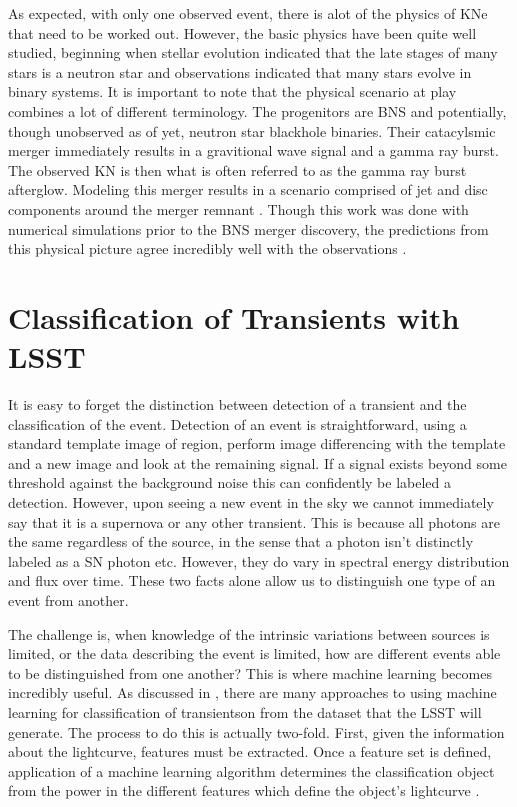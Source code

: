\documentclass[12pt]{article}
\begin{document}
As expected, with only one observed event, there is alot of the physics of KNe that need to be worked out. However, the basic physics have been quite well studied, beginning when stellar evolution indicated that the late stages of many stars is a neutron star and observations indicated that many stars evolve in binary systems. It is important to note that the physical scenario at play combines a lot of different terminology. The progenitors are BNS and potentially, though unobserved as of yet, neutron star blackhole binaries. Their catacylsmic merger immediately results in a gravitional wave signal and a gamma ray burst. The observed KN is then what is often referred to as the gamma ray burst afterglow. Modeling this merger results in a scenario comprised of jet and disc components around the merger remnant \citep{Rosswog2016a}. Though this work was done with numerical simulations prior to the BNS merger discovery, the predictions from this physical picture agree incredibly well with the observations \citep{Kasliwal2017}.\par

\section{Classification of Transients with LSST} %
It is easy to forget the distinction between detection of a transient and the classification of the event. Detection of an event is straightforward, using a standard template image of region, perform image differencing with the template and a new image and look at the remaining signal. If a signal exists beyond some threshold against the background noise this can confidently be labeled a detection. However, upon seeing a new event in the sky we cannot immediately say that it is a supernova or any other transient. This is because all photons are the same regardless of the source, in the sense that a photon isn't distinctly labeled as a SN photon etc. However, they do vary in spectral energy distribution and flux over time. These two facts alone allow us to distinguish one type of an event from another. \par
The challenge is, when knowledge of the intrinsic variations between sources is limited, or the data describing the event is limited, how are different events able to be distinguished from one another? This is where machine learning becomes incredibly useful. As discussed in \cite{Lochner2016}, there are many approaches to using machine learning for classification of transientson from the dataset that the LSST will generate. The process to do this is actually two-fold. First, given the information about the lightcurve, features must be extracted. Once a feature set is defined, application of a machine learning algorithm determines the classification object from the power in the different features which define the object's lightcurve \citep{Lochner2016}. \par
\end{document}

